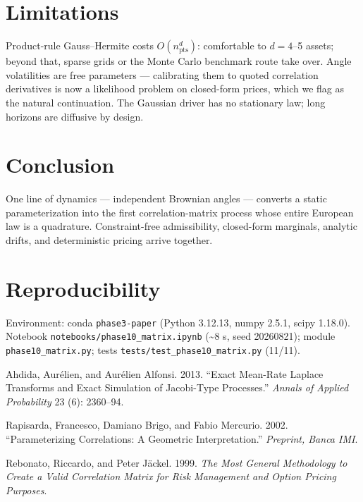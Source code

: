 \documentclass[
  english,
  10pt,
  letterpaper,
  DIV=11,
  numbers=noendperiod]{scrartcl}
\newlength{\cslhangindent}
\newenvironment{CSLReferences}[2] %
 {\begin{list}{}{%
  \setlength{\itemindent}{0pt}
  \setlength{\leftmargin}{0pt}
  \setlength{\parsep}{0pt}
  \ifodd #1
   \setlength{\leftmargin}{\cslhangindent}
   \setlength{\itemindent}{-1\cslhangindent}
  \fi
  \setlength{\itemsep}{#2\baselineskip}}}
 {\end{list}}
\begin{document}
\section{Limitations}\label{sec-limitations}

Product-rule Gauss--Hermite costs \(O(n_{\text{pts}}^d)\): comfortable
to \(d=4\)--5 assets; beyond that, sparse grids or the Monte Carlo
benchmark route take over. Angle volatilities are free parameters ---
calibrating them to quoted correlation derivatives is now a likelihood
problem on closed-form prices, which we flag as the natural
continuation. The Gaussian driver has no stationary law; long horizons
are diffusive by design.

\section{Conclusion}\label{sec-conclusion}

One line of dynamics --- independent Brownian angles --- converts a
static parameterization into the first correlation-matrix process whose
entire European law is a quadrature. Constraint-free admissibility,
closed-form marginals, analytic drifts, and deterministic pricing arrive
together.

\section{Reproducibility}\label{sec-repro}

Environment: conda \texttt{phase3-paper} (Python 3.12.13, numpy 2.5.1,
scipy 1.18.0). Notebook \texttt{notebooks/phase10\_matrix.ipynb}
(\textasciitilde8 s, seed 20260821); module \texttt{phase10\_matrix.py};
tests \texttt{tests/test\_phase10\_matrix.py} (11/11).

\protect{}\label{refs}
\begin{CSLReferences}{1}{1}
Ahdida, Aurélien, and Aurélien Alfonsi. 2013. {``Exact Mean-Rate Laplace
Transforms and Exact Simulation of Jacobi-Type Processes.''}
\emph{Annals of Applied Probability} 23 (6): 2360--94.

Rapisarda, Francesco, Damiano Brigo, and Fabio Mercurio. 2002.
{``Parameterizing Correlations: A Geometric Interpretation.''}
\emph{Preprint, Banca IMI}.

Rebonato, Riccardo, and Peter Jäckel. 1999. \emph{The Most General
Methodology to Create a Valid Correlation Matrix for Risk Management and
Option Pricing Purposes}.

\end{CSLReferences}
\end{document}
